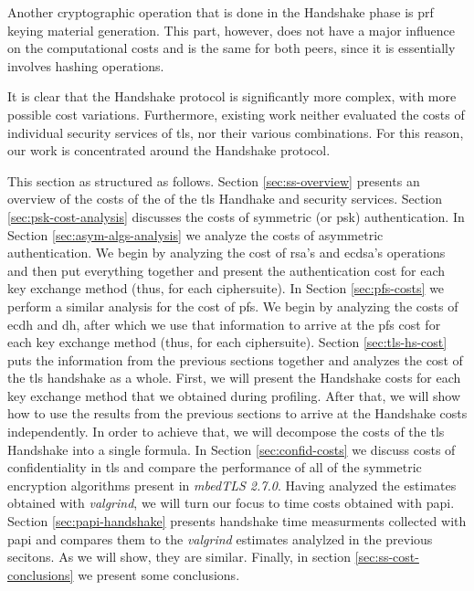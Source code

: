 Another cryptographic operation that is done in the Handshake phase is \gls{prf} keying material generation. This part, however,
does not have a major influence on the computational costs and is the same for both peers, since it is essentially involves
hashing operations.

It is clear that the Handshake protocol is significantly more complex, with more possible cost variations.
Furthermore, existing work neither evaluated the costs of individual security services of \gls{tls}, nor
their various combinations. For this reason, our work is concentrated around the Handshake protocol.

This section as structured as follows. 
Section \ref{sec:ss-overview}
presents an overview of the costs of the of the \gls{tls} Handhake and security services. Section \ref{sec:psk-cost-analysis} discusses the costs of symmetric (or \gls{psk})
authentication. In Section \ref{sec:asym-algs-analysis} we analyze the costs of asymmetric authentication. We begin by analyzing the cost of \gls{rsa}'s
and \gls{ecdsa}'s  operations and then put everything together and present the authentication cost for each key exchange method (thus, for each ciphersuite).
In Section \ref{sec:pfs-costs} we perform a similar analysis for the cost of \gls{pfs}. We begin by analyzing the costs of
\gls{ecdh} and \gls{dh}, after which we use that information to arrive at the \gls{pfs} cost for each key exchange method (thus, for each ciphersuite).
Section \ref{sec:tls-hs-cost} puts the information from the previous sections together and analyzes the cost of the \gls{tls} handshake as a whole.
First, we will present the Handshake costs for each key exchange method that we obtained during profiling. After that, we will show how to use the 
results from the previous sections to arrive at the Handshake costs independently. In order to achieve that, we will decompose the costs of the \gls{tls} Handshake 
into a single formula.
In Section \ref{sec:confid-costs} we discuss costs of confidentiality in \gls{tls} and compare the performance of all of the symmetric encryption algorithms
present in \textit{mbedTLS 2.7.0}. Having analyzed the estimates obtained with \textit{valgrind}, we will turn our focus to time costs obtained with \gls{papi}.
Section \ref{sec:papi-handshake} presents handshake time measurments collected with \gls{papi} and compares them to
the \textit{valgrind} estimates analylzed in the previous secitons. As we will show, they are similar.
Finally, in section \ref{sec:ss-cost-conclusions} we present some conclusions.

